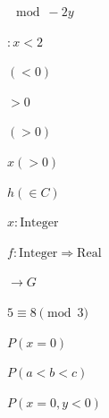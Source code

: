 \documentclass{article}
\begin{document}

$\mod -2y$

$:x<2$

$(<0)$ 

$>0$

$(>0)$

$x(>0)$

$h(\in C)$

$x : \mathrm{Integer}$

$f : \mathrm{Integer} \Rightarrow \mathrm{Real}$

$\rightarrow G$

$ 5\equiv 8 \pmod 3 $


$ P(x=0) $

$ P ( a < b < c) $

$ P(x = 0, y < 0) $
\end{document}
